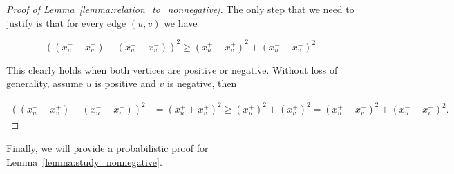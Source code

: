 \documentclass[a4paper]{article}
\theoremstyle{definition}
\begin{document}
\begin{proof}[Proof of Lemma~\ref{lemma:relation_to_nonnegative}]
The only step that we need to justify is that for every edge $(u, v)$ we have 

\begin{equation}
((x_u^{+}-x_v^{+})-(x_u^{-}-x_v^{-}))^2 \geq (x_u^{+}-x_v^{+})^2+(x_u^{-}-x_v^{-})^2
\end{equation}

This clearly holds when both vertices are positive or negative. Without loss of generality, assume $u$ is positive and $v$ is negative, then 

\begin{align}
    ((x_u^{+}-x_v^{+})-(x_u^{-}-x_v^{-}))^2 &= (x_u^{+} + x_v^{+})^2 \geq (x_u^{+})^2 + (x_v^{+})^2 = (x_u^{+}-x_v^{+})^2+(x_u^{-}-x_v^{-})^2.
\end{align}

\end{proof}

Finally, we will provide a probabilistic proof for Lemma~\ref{lemma:study_nonnegative}.
\end{document}
